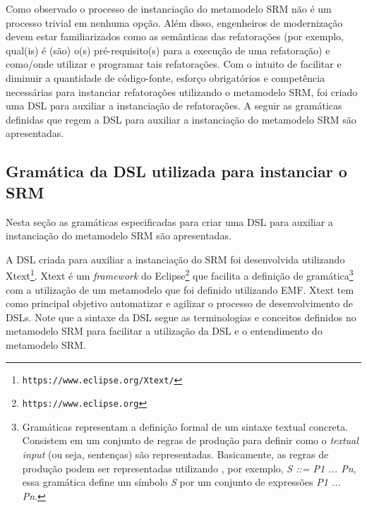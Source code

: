 Como observado o processo de instanciação do metamodelo SRM não é um processo trivial em nenhuma opção. Além disso, engenheiros de modernização devem estar familiarizados como as semânticas das refatorações (por exemplo, qual(is) é (são) o(s) pré-requisito(s) para a execução de uma refatoração) e como/onde utilizar e programar tais refatorações. Com o intuito de facilitar e diminuir a quantidade de código-fonte, esforço obrigatórios e competência necessárias para instanciar refatorações utilizando o metamodelo SRM, foi criado uma DSL para auxiliar a instanciação de refatorações. A seguir as gramáticas definidas que regem a DSL para auxiliar a instanciação do metamodelo SRM são apresentadas.

\subsection{Gramática da DSL utilizada para instanciar o SRM}

Nesta seção as gramáticas especificadas para criar uma DSL para auxiliar a instanciação do metamodelo SRM são apresentadas.
%

A DSL criada para auxiliar a instanciação do SRM foi desenvolvida utilizando Xtext\footnote{\texttt{https://www.eclipse.org/Xtext/}}. Xtext é um \textit{framework} do Eclipse\footnote{\texttt{https://www.eclipse.org}} que facilita a definição de gramática\footnote{Gramáticas representam a definição formal de um sintaxe textual concreta. Consistem em um conjunto de regras de produção para definir como o \textit{textual input} (ou seja, sentenças) são representadas. Basicamente, as regras de produção podem ser representadas utilizando , por exemplo, \textit{S ::= P1 ... Pn}, essa gramática define um símbolo \textit{S} por um conjunto de expressões \textit{P1 ... Pn}.} 
com a utilização de um metamodelo que foi definido utilizando EMF. Xtext tem como principal objetivo automatizar e agilizar o processo de desenvolvimento de DSLs. Note que a sintaxe da DSL segue as terminologias e conceitos definidos no metamodelo SRM para facilitar a utilização da DSL e o entendimento do metamodelo SRM.

